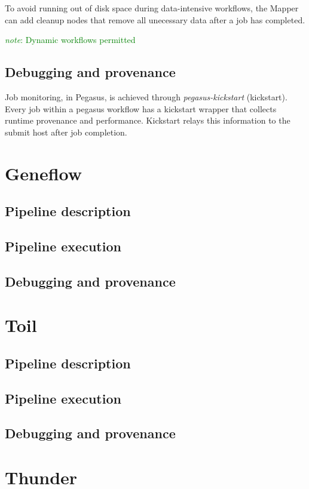 \documentclass{report}
\newcommand{\note}[1]{\textcolor{green}{\textit{note}: #1}}
\begin{document}
        To avoid running out of disk space during data-intensive workflows, the Mapper can add cleanup nodes that remove all unecessary data after a job has completed.
 
        \note{Dynamic workflows permitted}

        \subsection{Debugging and provenance}
         Job monitoring, in Pegasus, is achieved through \textit{pegasus-kickstart} (kickstart). Every job within a pegasus workflow has a kickstart wrapper that collects runtime provenance
        and performance. Kickstart relays this information to the submit host after job completion. 

    \section{Geneflow}
        \subsection{Pipeline description}
        \subsection{Pipeline execution}
        \subsection{Debugging and provenance}
    \section{Toil}
        \subsection{Pipeline description}
        \subsection{Pipeline execution}
        \subsection{Debugging and provenance}
    \section{Thunder}
\end{document}

